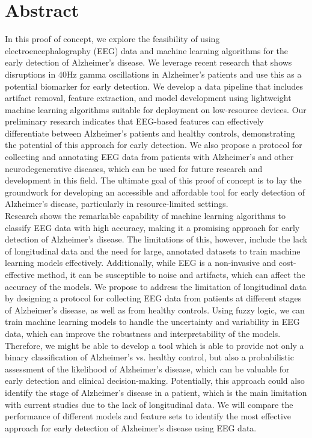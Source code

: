 \documentclass[openany]{book}
\begin{document}
\section{Abstract}
    In this proof of concept, we explore the feasibility of using electroencephalography (EEG) data and machine learning algorithms for the early detection of Alzheimer's disease. We leverage recent research that shows disruptions in 40Hz gamma oscillations in Alzheimer's patients and use this as a potential biomarker for early detection. We develop a data pipeline that includes artifact removal, feature extraction, and model development using lightweight machine learning algorithms suitable for deployment on low-resource devices. Our preliminary research indicates that EEG-based features can effectively differentiate between Alzheimer's patients and healthy controls, demonstrating the potential of this approach for early detection. We also propose a protocol for collecting and annotating EEG data from patients with Alzheimer's and other neurodegenerative diseases, which can be used for future research and development in this field. The ultimate goal of this proof of concept is to lay the groundwork for developing an accessible and affordable tool for early detection of Alzheimer's disease, particularly in resource-limited settings. \\
    Research shows the remarkable capability of machine learning algorithms to classify EEG data with high accuracy, making it a promising approach for early detection of Alzheimer's disease. The limitations of this, however, include the lack of longitudinal data and the need for large, annotated datasets to train machine learning models effectively. Additionally, while EEG is a non-invasive and cost-effective method, it can be susceptible to noise and artifacts, which can affect the accuracy of the models. We propose to address the limitation of longitudinal data by designing a protocol for collecting EEG data from patients at different stages of Alzheimer's disease, as well as from healthy controls. Using fuzzy logic, we can train machine learning models to handle the uncertainty and variability in EEG data, which can improve the robustness and interpretability of the models. Therefore, we might be able to develop a tool which is able to provide not only a binary classification of Alzheimer's vs. healthy control, but also a probabilistic assessment of the likelihood of Alzheimer's disease, which can be valuable for early detection and clinical decision-making. Potentially, this approach could also identify the stage of Alzheimer's disease in a patient, which is the main limitation with current studies due to the lack of longitudinal data. We will compare the performance of different models and feature sets to identify the most effective approach for early detection of Alzheimer's disease using EEG data.
\end{document}

